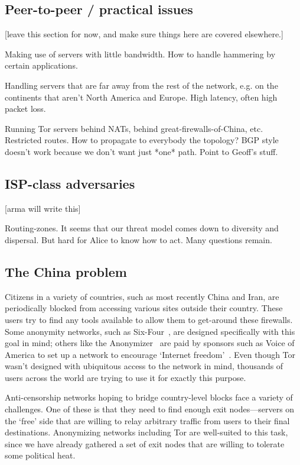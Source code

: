 \documentclass{llncs}
\begin{document}
\subsection{Peer-to-peer / practical issues}

[leave this section for now, and make sure things here are covered
elsewhere.]

Making use of servers with little bandwidth. How to handle hammering by
certain applications.

Handling servers that are far away from the rest of the network, e.g. on
the continents that aren't North America and Europe. High latency,
often high packet loss.

Running Tor servers behind NATs, behind great-firewalls-of-China, etc.
Restricted routes. How to propagate to everybody the topology? BGP
style doesn't work because we don't want just *one* path. Point to
Geoff's stuff.

\subsection{ISP-class adversaries}

[arma will write this]

Routing-zones. It seems that our threat model comes down to diversity and
dispersal. But hard for Alice to know how to act. Many questions remain.

\subsection{The China problem}

Citizens in a variety of countries, such as most recently China and
Iran, are periodically blocked from accessing various sites outside
their country. These users try to find any tools available to allow
them to get-around these firewalls. Some anonymity networks, such as
Six-Four~\cite{six-four}, are designed specifically with this goal in
mind; others like the Anonymizer~\cite{anonymizer} are paid by sponsors
such as Voice of America to set up a network to encourage `Internet
freedom'~\cite{voice-of-america-anonymizer}. Even though Tor wasn't
designed with ubiquitous access to the network in mind, thousands of
users across the world are trying to use it for exactly this purpose.

Anti-censorship networks hoping to bridge country-level blocks face
a variety of challenges. One of these is that they need to find enough
exit nodes---servers on the `free' side that are willing to relay
arbitrary traffic from users to their final destinations. Anonymizing
networks including Tor are well-suited to this task, since we have
already gathered a set of exit nodes that are willing to tolerate some
political heat.
\end{document}
